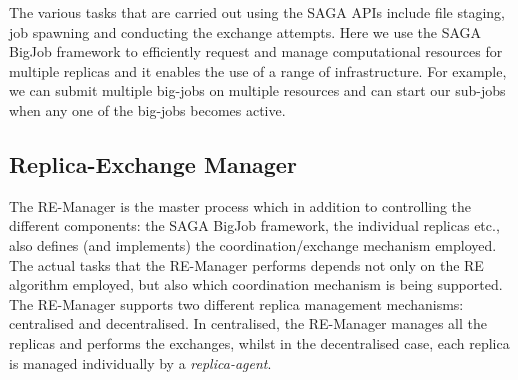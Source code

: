 \documentclass{rspublic}
\newcommand{\jhanote}[1]{ {\textcolor{red} { ***shantenu: #1 }}}
\newcommand{\alnote}[1]{ {\textcolor{blue} { ***andre: #1 }}}
\newcommand{\athotanote}[1]{ {\textcolor{green} { ***athota: #1 }}}
\newcommand{\alnote}[1]{}
\newcommand{\athotanote}[1]{}
\newcommand{\jhanote}[1]{}
\begin{document}
The various tasks that are carried out using the SAGA APIs include
file staging, job spawning and conducting the exchange attempts. Here
we use the SAGA BigJob framework to efficiently request and manage
computational resources for multiple replicas and it enables the use of
a range of infrastructure.  For example, we can submit multiple
big-jobs on multiple resources and can start our sub-jobs when any one
of the big-jobs becomes active.






\subsection{Replica-Exchange Manager}\label{repexmanager} 

  
  
The RE-Manager is the master process which in addition to controlling
the different components: the SAGA BigJob framework, the individual
replicas etc., also defines (and implements) the coordination/exchange
mechanism employed.  The actual tasks that the RE-Manager performs
depends not only on the RE algorithm employed, but also which
coordination mechanism is being supported.  The RE-Manager supports
two different replica management mechanisms: centralised and
decentralised. In centralised, the RE-Manager manages all the replicas
and performs the exchanges, whilst in the decentralised case, each
replica is managed individually by a {\it replica-agent}.
\end{document}
